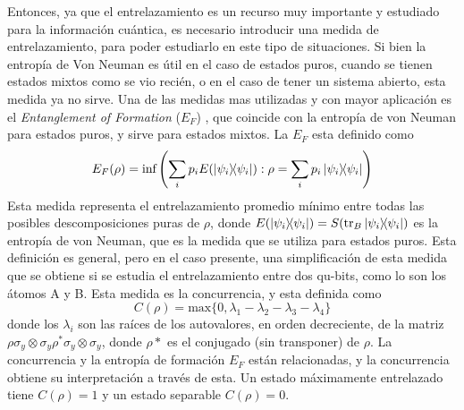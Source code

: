 Entonces, ya que el entrelazamiento es un recurso muy importante y estudiado para la información cuántica, es necesario introducir una medida de entrelazamiento, para poder estudiarlo en este tipo de situaciones. Si bien la entropía de Von Neuman es útil en el caso de estados puros, cuando se tienen estados mixtos como se vio recién, o en el caso de tener un sistema abierto, esta medida ya no sirve. Una de las medidas mas utilizadas y con mayor aplicación es el \textit{Entanglement of Formation} ($E_F$) \cite{an intro to entanglement measures}, que coincide con la entropía de von Neuman para estados puros, y sirve para estados mixtos. La $E_F$ esta definido como
\begin{equation}
    E_F(\rho)=\text{inf}\left( \sum_i p_i E(\ketbra{\psi_i}{\psi_i}) : \rho = \sum_i p_i\ketbra{\psi_i}{\psi_i}\right)
\end{equation}
Esta medida representa el entrelazamiento promedio mínimo entre todas las posibles descomposiciones puras de $\rho$, donde $E(\ketbra{\psi_i}{\psi_i})=S(\tr_B{\ketbra{\psi_i}{\psi_i}})$ es la entropía de von Neuman, que es la medida que se utiliza para estados puros. Esta definición es general, pero en el caso presente, una simplificación de esta medida que se obtiene si se estudia el entrelazamiento entre dos qu-bits, como lo son los átomos A y B. Esta medida es la concurrencia, y esta definida como
\begin{equation}
    C(\rho)=\text{max}\{0,\lambda_1-\lambda_2-\lambda_3-\lambda_4\}
    \label{ec4:concurrencia}
\end{equation}
donde los $\lambda_i$ son las raíces de los autovalores, en orden decreciente, de la matriz $\rho\sigma_y\otimes\sigma_y\rho^*\sigma_y\otimes\sigma_y$, donde $\rho*$ es el conjugado (sin transponer) de $\rho$. La concurrencia y la entropía de formación $E_F$ están relacionadas, y la concurrencia obtiene su interpretación a través de esta. Un estado máximamente entrelazado tiene $C(\rho)=1$ y un estado separable $C(\rho)=0$. 


